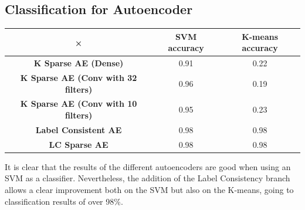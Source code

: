 \subsection{Classification for Autoencoder}


\begin{center}
\begin{tabular}{|c|c|c|}\hline
× & \textbf{SVM accuracy} & \textbf{K-means accuracy}\\\hline
\textbf{K Sparse AE (Dense)} & 0.91 & 0.22\\\hline
\textbf{K Sparse AE (Conv with 32 filters)} & 0.96 & 0.19\\\hline
\textbf{K Sparse AE (Conv with 10 filters)} & 0.95 & 0.23\\\hline
\textbf{Label Consistent AE} & 0.98 & 0.98\\\hline
\textbf{LC Sparse AE} & 0.98 & 0.98\\\hline
\end{tabular}
\end{center}
It is clear that the results of the different autoencoders are good when using an SVM as a classifier. Nevertheless, the addition of the Label Consistency branch allows a clear improvement both on the SVM but also on the K-means, going to classification results of over 98\%. 
